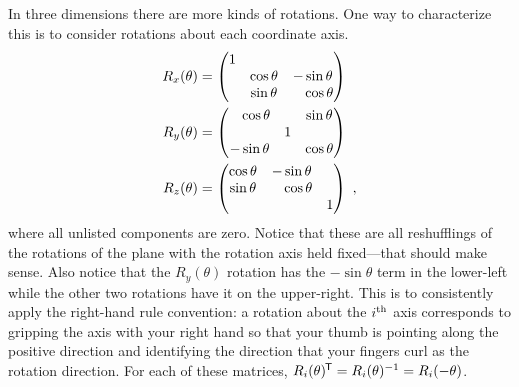 \begin{example}
In three dimensions there are more kinds of rotations. One way to characterize this is to consider rotations about each coordinate axis. 
\begin{align}
    R_x(\theta) &= 
    \begin{pmatrix}
        1 & & \\
        &  \cos\theta & -\sin\theta \\
        & \sin\theta &  \pp\cos\theta 
    \end{pmatrix}
    \\
    R_y(\theta) &= 
    \begin{pmatrix}
        \pp \cos\theta & &\sin\theta \\
        & 1 & \\
        -\sin\theta& & \cos\theta
    \end{pmatrix}
    \\
    R_z(\theta) &= 
    \begin{pmatrix}
       \cos\theta & - \sin\theta & \\
        \sin\theta &\pp \cos\theta & \\
        & & 1
    \end{pmatrix}\ ,
    \label{eq:3D:rotation:matrices}
\end{align}
where all unlisted components are zero. Notice that these are all reshufflings of the rotations of the plane with the rotation axis held fixed---that should make sense. Also notice that the $R_y(\theta)$ rotation has the $-\sin\theta$ term in the lower-left while the other two rotations have it on the upper-right. This is to consistently apply the right-hand rule convention: a rotation about the $i^\textnormal{th}$ axis corresponds to gripping the axis with your right hand so that your thumb is pointing along the positive direction and identifying the direction that your fingers curl as the rotation direction. For each of these matrices, $R_i(\theta)^{\mkern-1.5mu\mathsf{T}} = R_i(\theta)^{-1} = R_i(-\theta)$. 
\end{example}
